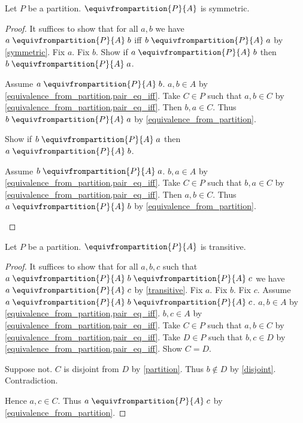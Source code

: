 \begin{proposition}\label{equivalence_from_partition_symmetric}
    Let $P$ be a partition.
    $\equivfrompartition{P}{A}$ is symmetric.
\end{proposition}
\begin{proof}
    It suffices to show that for all $a,b$ we have
        $a\mathrel{\equivfrompartition{P}{A}}b$ iff
        $b\mathrel{\equivfrompartition{P}{A}}a$
        by \cref{symmetric}.
    Fix $a$.
    Fix $b$.
    Show if $a\mathrel{\equivfrompartition{P}{A}}b$ then
        $b\mathrel{\equivfrompartition{P}{A}}a$.
    \begin{subproof}
        Assume $a\mathrel{\equivfrompartition{P}{A}}b$.
        $a,b\in A$ by \cref{equivalence_from_partition,pair_eq_iff}.
        Take $C\in P$ such that $a,b\in C$
            by \cref{equivalence_from_partition,pair_eq_iff}.
        Then $b,a\in C$.
        Thus $b\mathrel{\equivfrompartition{P}{A}}a$
            by \cref{equivalence_from_partition}.
    \end{subproof}
    Show if $b\mathrel{\equivfrompartition{P}{A}}a$ then
        $a\mathrel{\equivfrompartition{P}{A}}b$.
    \begin{subproof}
        Assume $b\mathrel{\equivfrompartition{P}{A}}a$.
        $b,a\in A$ by \cref{equivalence_from_partition,pair_eq_iff}.
        Take $C\in P$ such that $b,a\in C$
            by \cref{equivalence_from_partition,pair_eq_iff}.
        Then $a,b\in C$.
        Thus $a\mathrel{\equivfrompartition{P}{A}}b$
            by \cref{equivalence_from_partition}.
    \end{subproof}
\end{proof}

\begin{proposition}\label{equivalence_from_partition_transitive}
    Let $P$ be a partition.
    $\equivfrompartition{P}{A}$ is transitive.
\end{proposition}
\begin{proof}
    It suffices to show that for all $a,b,c$ such that
        $a\mathrel{\equivfrompartition{P}{A}}b
        \mathrel{\equivfrompartition{P}{A}}c$
        we have $a\mathrel{\equivfrompartition{P}{A}}c$
        by \cref{transitive}.
    Fix $a$.
    Fix $b$.
    Fix $c$.
    Assume $a\mathrel{\equivfrompartition{P}{A}}b
        \mathrel{\equivfrompartition{P}{A}}c$.
    $a,b\in A$ by \cref{equivalence_from_partition,pair_eq_iff}.
    $b,c\in A$ by \cref{equivalence_from_partition,pair_eq_iff}.
    Take $C\in P$ such that $a,b\in C$
        by \cref{equivalence_from_partition,pair_eq_iff}.
    Take $D\in P$ such that $b,c\in D$
        by \cref{equivalence_from_partition,pair_eq_iff}.
    Show $C=D$.
    \begin{subproof}
        Suppose not.
        $C$ is disjoint from $D$ by \cref{partition}.
        Thus $b\notin D$ by \cref{disjoint}.
        Contradiction.
    \end{subproof}
    Hence $a,c\in C$.
    Thus $a\mathrel{\equivfrompartition{P}{A}}c$
        by \cref{equivalence_from_partition}.
\end{proof}

